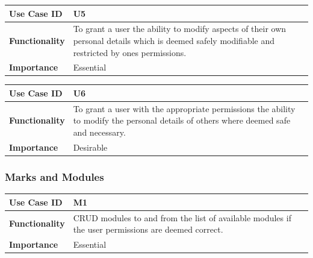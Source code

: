 \documentclass[a4paper,12pt]{article}
\begin{document}
        	\begin{center}
        		\begin{tabularx}{\textwidth}{ |X|X| }
        			
        			\hline
        			\textbf{Use Case ID} & U5 \\
        			\hline
        			\textbf{Functionality} & To grant a user the ability to modify aspects of their own personal details which is deemed safely modifiable and restricted by ones permissions. \\
        			\hline
        			\textbf{Importance} & Essential \\
        			\hline
        			
        		\end{tabularx}
        	\end{center}
        	
        	\begin{center}
        		\begin{tabularx}{\textwidth}{ |X|X| }
        			
        			\hline
        			\textbf{Use Case ID} & U6 \\
        			\hline
        			\textbf{Functionality} & To grant a user with the appropriate permissions the ability to modify the personal details of others where deemed safe and necessary. \\
        			\hline
        			\textbf{Importance} & Desirable \\
        			\hline
        			
        		\end{tabularx}
        	\end{center}
        
        	\subsubsection{Marks and Modules}
        	
        	\begin{center}
	        	\begin{tabularx}{\textwidth}{ |X|X| }
	        		
	        		\hline
	        		\textbf{Use Case ID} & M1 \\
	        		\hline
	        		\textbf{Functionality} & CRUD modules to and from the list of available modules if the user permissions are deemed correct. \\
	        		\hline
	        		\textbf{Importance} & Essential \\
	        		\hline
	        		
	        	\end{tabularx}
        	\end{center}
        
\end{document}

